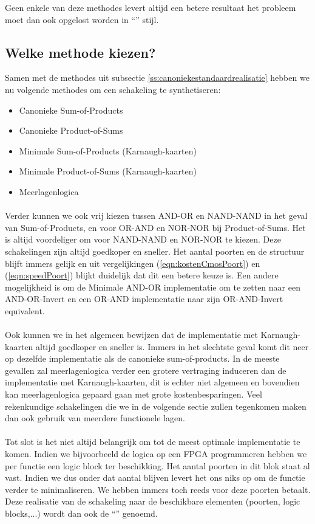Geen enkele van deze methodes levert altijd een betere resultaat het probleem moet dan ook opgelost worden in ``'' stijl.
\subsection{Welke methode kiezen?}
Samen met de methodes uit subsectie \ref{ss:canoniekestandaardrealisatie} hebben we nu volgende methodes om een schakeling te synthetiseren:
\begin{itemize}
 \item Canonieke Sum-of-Products
 \item Canonieke Product-of-Sums
 \item Minimale Sum-of-Products (Karnaugh-kaarten)
 \item Minimale Product-of-Sums (Karnaugh-kaarten)
 \item Meerlagenlogica
\end{itemize}
\paragraph{}Verder kunnen we ook vrij kiezen tussen AND-OR en NAND-NAND in het geval van Sum-of-Products, en voor OR-AND en NOR-NOR bij Product-of-Sums. Het is altijd voordeliger om voor NAND-NAND en NOR-NOR te kiezen. Deze schakelingen zijn altijd goedkoper en sneller. Het aantal poorten en de structuur blijft immers gelijk en uit vergelijkingen (\ref{eqn:kostenCmosPoort}) en (\ref{eqn:speedPoort}) blijkt duidelijk dat dit een betere keuze is. Een andere mogelijkheid is om de Minimale AND-OR implementatie om te zetten naar een AND-OR-Invert en een OR-AND implementatie naar zijn OR-AND-Invert equivalent.
\paragraph{}Ook kunnen we in het algemeen bewijzen dat de implementatie met Karnaugh-kaarten altijd goedkoper en sneller is. Immers in het slechtste geval komt dit neer op dezelfde implementatie als de canonieke sum-of-products. In de meeste gevallen zal meerlagenlogica verder een grotere vertraging induceren dan de implementatie met Karnaugh-kaarten, dit is echter niet algemeen en bovendien kan meerlagenlogica gepaard gaan met grote kostenbesparingen. Veel rekenkundige schakelingen die we in de volgende sectie zullen tegenkomen maken dan ook gebruik van meerdere functionele lagen.
\paragraph{}Tot slot is het niet altijd belangrijk om tot de meest optimale implementatie te komen. Indien we bijvoorbeeld de logica op een FPGA programmeren hebben we per functie een logic block ter beschikking. Het aantal poorten in dit blok staat al vast. Indien we dus onder dat aantal blijven levert het ons niks op om de functie verder te minimaliseren. We hebben immers toch reeds voor deze poorten betaalt. Deze realisatie van de schakeling naar de beschikbare elementen (poorten, logic blocks,...) wordt dan ook de ``'' genoemd.

